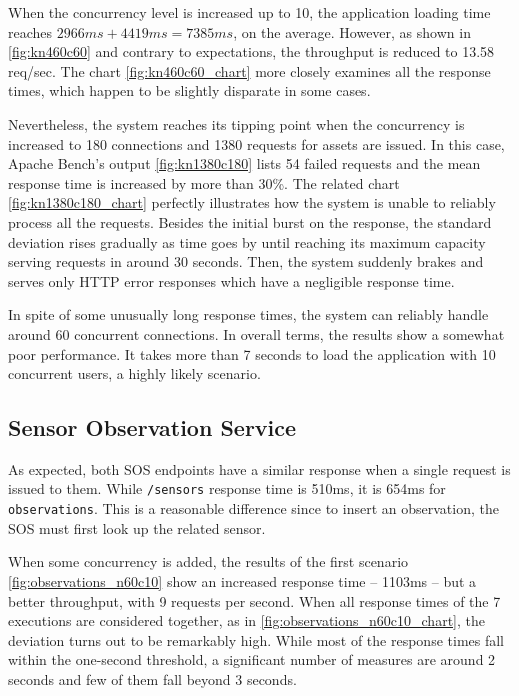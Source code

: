 When the concurrency level is increased up to 10, the application loading time reaches $2966ms + 4419ms = 7385ms$, on the average. However, as shown in \ref{fig:kn460c60} and contrary to expectations, the throughput is reduced to 13.58 req/sec. The chart \ref{fig:kn460c60_chart} more closely examines all the response times, which happen to be slightly disparate in some cases.

Nevertheless, the system reaches its tipping point when the concurrency is increased to 180 connections and 1380 requests for assets are issued. In this case, Apache Bench's output \ref{fig:kn1380c180} lists 54 failed requests and the mean response time is increased by more than 30\%. The related chart \ref{fig:kn1380c180_chart} perfectly illustrates how the system is unable to reliably process all the requests. Besides the initial burst on the response, the standard deviation rises gradually as time goes by until reaching its maximum capacity serving requests in around 30 seconds. Then, the system suddenly brakes and serves only HTTP error responses which have a negligible response time.

In spite of some unusually long response times, the system can reliably handle around 60 concurrent connections. In overall terms, the results show a somewhat poor performance. It takes more than 7 seconds to load the application with 10 concurrent users, a highly likely scenario.

\subsection*{Sensor Observation Service}

As expected, both SOS endpoints have a similar response when a single request is issued to them. While \texttt{/sensors} response time is 510ms, it is 654ms for \texttt{observations}. This is a reasonable difference since to insert an observation, the SOS must first look up the related sensor.

When some concurrency is added, the results of the first scenario \ref{fig:observations_n60c10} show an increased response time -- 1103ms -- but a better throughput, with 9 requests per second. When all response times of the 7 executions are considered together, as in \ref{fig:observations_n60c10_chart}, the deviation turns out to be remarkably high. While most of the response times fall within the one-second threshold, a significant number of measures are around 2 seconds and few of them fall beyond 3 seconds.

